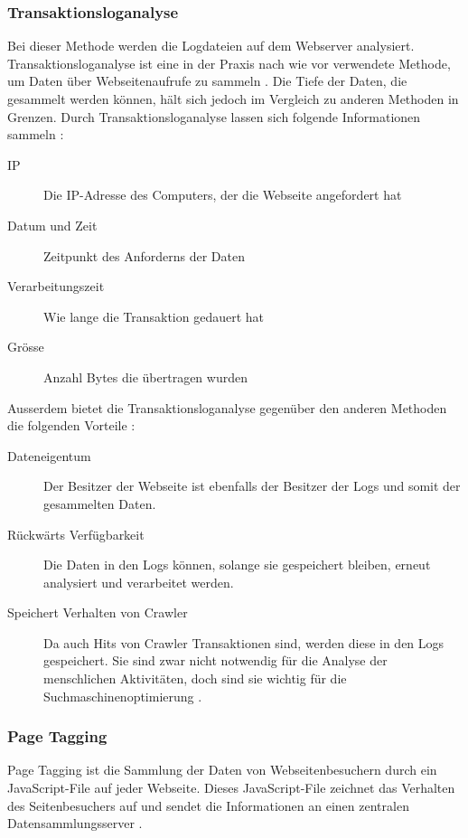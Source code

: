 \subsubsection{Transaktionsloganalyse} 
Bei dieser Methode werden die Logdateien auf dem Webserver analysiert. Transaktionsloganalyse ist eine in der Praxis nach wie vor verwendete Methode, um Daten über Webseitenaufrufe zu sammeln \parencite[S. 173]{nakatani2011toolselectionmethod}. Die Tiefe der Daten, die gesammelt werden können, hält sich jedoch im Vergleich zu anderen Methoden in Grenzen. Durch Transaktionsloganalyse lassen sich folgende Informationen sammeln \parencite[S. 2]{waisberg2009webShort}:

\begin{description}
  \item[IP] Die IP-Adresse des Computers, der die Webseite angefordert hat
  \item[Datum und Zeit] Zeitpunkt des Anforderns der Daten
  \item[Verarbeitungszeit] Wie lange die Transaktion gedauert hat
  \item[Grösse] Anzahl Bytes die übertragen wurden
\end{description}

Ausserdem bietet die Transaktionsloganalyse gegenüber den anderen Methoden die folgenden Vorteile \parencite[S. 2]{waisberg2009webShort}:

\begin{description}
  \item[Dateneigentum] Der Besitzer der Webseite ist ebenfalls der Besitzer der Logs und somit der gesammelten Daten. 
  \item[Rückwärts Verfügbarkeit] Die Daten in den Logs können, solange sie gespeichert bleiben, erneut analysiert und verarbeitet werden. 
  \item[Speichert Verhalten von Crawler] Da auch Hits von Crawler Transaktionen sind, werden diese in den Logs gespeichert. Sie sind zwar nicht notwendig für die Analyse der menschlichen Aktivitäten, doch sind sie wichtig für die Suchmaschinenoptimierung \parencite[S. 174]{nakatani2011toolselectionmethod}. 
\end{description}


\subsubsection{Page Tagging} 
Page Tagging ist die Sammlung der Daten von Webseitenbesuchern durch ein JavaScript-File auf jeder Webseite. Dieses JavaScript-File zeichnet das Verhalten des Seitenbesuchers auf und sendet die Informationen an einen zentralen Datensammlungsserver \parencite[S. 173]{nakatani2011toolselectionmethod}.

